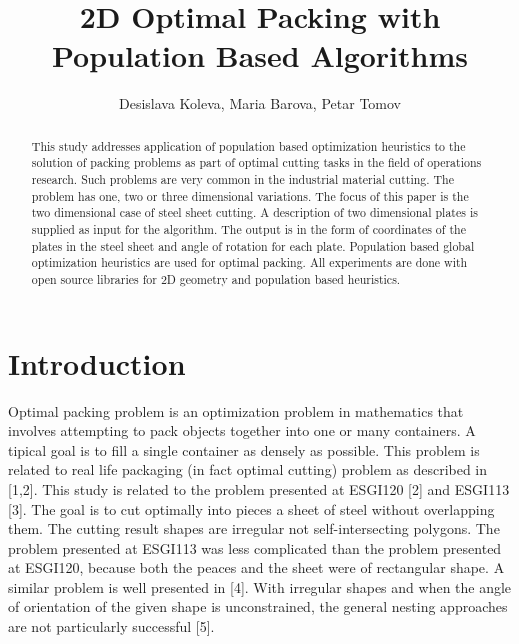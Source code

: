 \documentclass{llncs}
\begin{document}
\pagestyle{headings} 
\mainmatter
%
\title{2D Optimal Packing with Population Based Algorithms}
%
\author{Desislava Koleva, Maria Barova, Petar Tomov}
%
%
%
%
%
\maketitle
%
\begin{abstract}
This study addresses application of population based optimization heuristics to the solution of packing problems as part of optimal cutting tasks in the field of operations research. Such problems are very common in the industrial material cutting. The problem has one, two or three dimensional variations. The focus of this paper is the two dimensional case of steel sheet cutting. A description of two dimensional plates is supplied as input for the algorithm. The output is in the form of coordinates of the plates in the steel sheet and angle of rotation for each plate. Population based global optimization heuristics are used for optimal packing. All experiments are done with open source libraries for 2D geometry and population based heuristics. 
\end{abstract}
%
\section{Introduction}
%
Optimal packing problem is an optimization problem in mathematics that involves attempting to pack objects together into one or many containers. A tipical goal is to fill a single container as densely as possible. This problem is related to real life packaging (in fact optimal cutting) problem as described in [1,2]. This study is related to the problem presented at ESGI120 [2] and ESGI113 [3]. The goal is to cut optimally into pieces a sheet of steel without overlapping them. The cutting result shapes are irregular not self-intersecting polygons. The problem presented at ESGI113 was less complicated than the problem presented at ESGI120, because both the peaces and the sheet were of rectangular shape. A similar problem is well presented in [4]. With irregular shapes and when the angle of orientation of the given shape is unconstrained, the general nesting approaches are not particularly successful [5]. 
\end{document}
